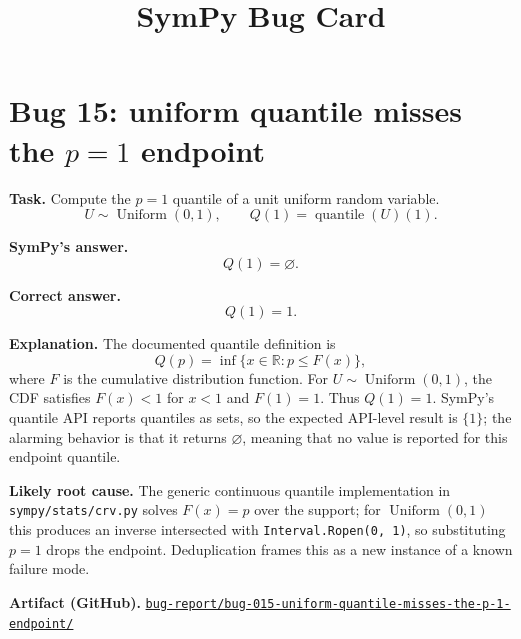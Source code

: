 \documentclass[11pt]{article}
\title{SymPy Bug Card}
\author{}
\date{}
\newcommand{\artifactrepo}{https://github.com/TODO-org/TODO-repo}
\newcommand{\bugbundle}[1]{\href{\artifactrepo/tree/main/bug-report/#1}{\nolinkurl{bug-report/#1/}}}
\begin{document}
\maketitle

\section*{Bug 15: uniform quantile misses the \texorpdfstring{\(p=1\)}{p = 1} endpoint}

\begin{counterexamplebox}
\textbf{Task.} Compute the \(p=1\) quantile of a unit uniform random variable.
\[
U\sim\operatorname{Uniform}(0,1),\qquad Q(1)=\operatorname{quantile}(U)(1).
\]

\medskip
\textbf{SymPy's answer.}
\[
Q(1)=\varnothing.
\]

\medskip
\textbf{Correct answer.}
\[
Q(1)=1.
\]

\medskip
\textbf{Explanation.} The documented quantile definition is
\[
Q(p)=\inf\{x\in\mathbb{R}:p\leq F(x)\},
\]
where \(F\) is the cumulative distribution function.  For \(U\sim\operatorname{Uniform}(0,1)\), the CDF satisfies \(F(x)<1\) for \(x<1\) and \(F(1)=1\).  Thus \(Q(1)=1\).  SymPy's quantile API reports quantiles as sets, so the expected API-level result is \(\{1\}\); the alarming behavior is that it returns \(\varnothing\), meaning that no value is reported for this endpoint quantile.

\medskip
\textbf{Likely root cause.} The generic continuous quantile implementation in \nolinkurl{sympy/stats/crv.py} solves \(F(x)=p\) over the support; for \(\operatorname{Uniform}(0,1)\) this produces an inverse intersected with \texttt{Interval.Ropen(0, 1)}, so substituting \(p=1\) drops the endpoint.  Deduplication frames this as a new instance of a known failure mode.

\medskip
\textbf{Artifact (GitHub).} \bugbundle{bug-015-uniform-quantile-misses-the-p-1-endpoint}
\end{counterexamplebox}
\end{document}
